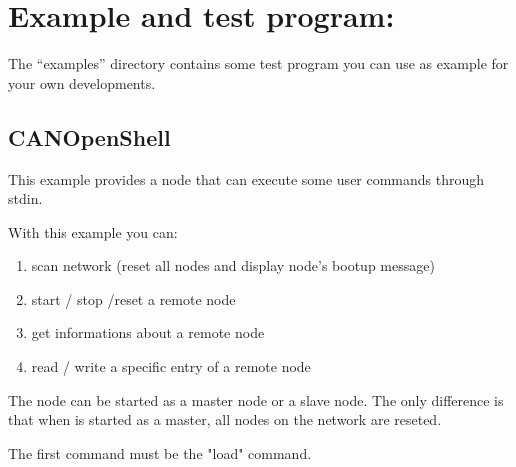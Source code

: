\documentclass[12pt,english,a4paper]{book}
\begin{document}
\section{Example and test program:}

The {}``examples'' directory contains some test program you can
use as example for your own developments.

\subsection{CANOpenShell}

This example provides a node that can execute some user commands through stdin. 

With this example you can:
\begin{enumerate}
\item scan network (reset all nodes and display node's bootup message)
\item start / stop /reset a remote node
\item get informations about a remote node
\item read / write a specific entry of a remote node
\end{enumerate}

The node can be started as a master node or a slave node. The only difference is 
that when is started as a master, all nodes on the network are reseted.

The first command must be the "load" command.
\end{document}

